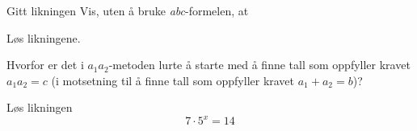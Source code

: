 






\opgt	

Gitt likningen
Vis, uten å bruke \textit{abc}-formelen, at

Løs likningene.\os
{}\\[12pt]

Hvorfor er det i $ a_1 a_2$-metoden lurte å starte med å finne tall som oppfyller kravet $ a_1a_2=c $ (i motsetning til å finne tall som oppfyller kravet $ a_1+a_2=b $)?


Løs likningen 
\[7\cdot5^x=14 \]	

